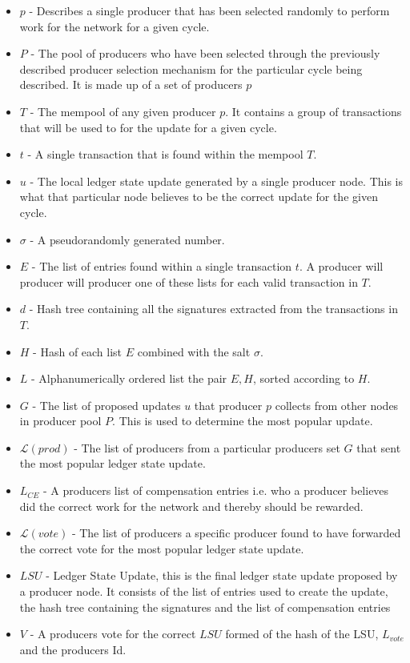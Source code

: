 \documentclass{article}
\begin{document}
\begin{itemize}

\item $p$ - Describes a single producer that has been selected randomly to perform work for the network for a given cycle. 
\item $P$ - The pool of producers who have been selected through the previously described producer selection mechanism for the particular cycle being described. It is made up of a set of producers $p$
\item $T$ - The mempool of any given producer $p$. It contains a group of transactions that will be used to for the update for a given cycle. 
\item $t$ - A single transaction that is found within the mempool $T$. 
\item $u$ - The local ledger state update generated by a single producer node. This is what that particular node believes to be the correct update for the given cycle. 
\item $\sigma$ - A pseudorandomly generated number. 
\item $E$ - The list of entries found within a single transaction $t$. A producer will producer  will producer one of these lists for each valid transaction in $T$.
\item $d$ - Hash tree containing all the signatures extracted from the transactions in $T$.
\item $H$ - Hash of each list $E$ combined with the salt $\sigma$.
\item $L$ - Alphanumerically ordered list the pair $E,H$, sorted according to $H$. 
\item $G$ - The list of proposed updates $u$ that producer $p$ collects from other nodes in producer pool $P$. This is used to determine the most popular update. 
\item $\mathcal{L}(prod)$ - The list of producers from a particular producers set $G$ that sent the most popular ledger state update.
\item $L_{CE}$ - A producers list of compensation entries i.e. who a producer believes did the correct work for the network and thereby should be rewarded. 
\item $\mathcal{L}(vote)$ - The list of producers a specific producer found to have forwarded the correct vote for the most popular ledger state update. 
\item $LSU$ - Ledger State Update, this is the final ledger state update proposed by a producer node. It consists of the list of entries used to create the update, the hash tree containing the signatures and the list of compensation entries
\item $V$ - A producers vote for the correct $LSU$ formed of the hash of the LSU, $L_{vote}$ and the producers Id.

 

\end{itemize}
\end{document}
